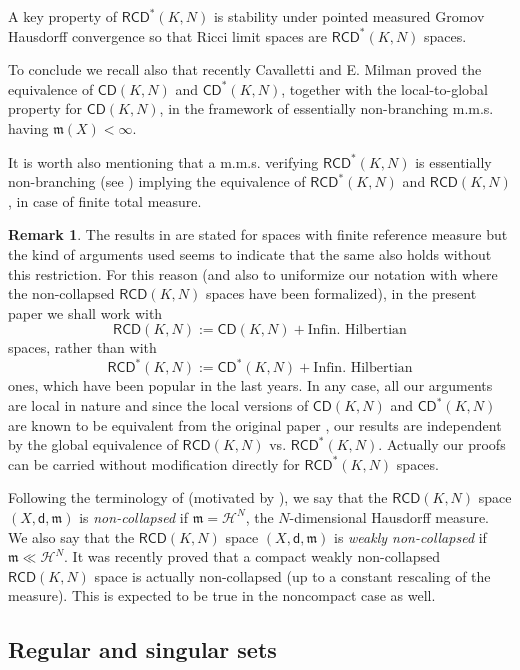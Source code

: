 \documentclass[a4paper]{amsart}
\theoremstyle{plain}
\theoremstyle{definition}
\newtheorem{remark}[lemma]{Remark}
\numberwithin{equation}{section}
\newcommand{\RCD}{\mathsf{RCD}}
\newcommand{\CD}{\mathsf{CD}}
\newcommand{\mm}{\mathfrak m}
\newcommand{\sfd}{\mathsf d}
\newcommand{\cH}{\mathcal{H}}
\begin{document}
{{A key property of $\RCD^{*}(K,N)$ is  stability under pointed measured Gromov Hausdorff convergence  \cite{AGS,GMS2013} so that Ricci limit spaces are $\RCD^{*}(K,N)$ spaces.

To conclude we recall also that recently  Cavalletti and E. Milman \cite{CaMi} proved the equivalence
of $\CD(K,N)$ and $\CD^{*}(K,N)$, together with the local-to-global property for $\CD(K,N)$, in the framework of  essentially non-branching m.m.s. having $\mm(X) < \infty$.

It is worth also mentioning that a m.m.s. verifying $\RCD^{*}(K,N)$ is essentially non-branching (see \cite[Corollary 1.2]{rajalasturm})
implying the equivalence of $\RCD^{*}(K,N)$ and  $\RCD(K,N)$, in case of finite total measure.

\begin{remark}
The results in \cite{CaMi} are stated for spaces with finite reference measure but the kind of
arguments used seems to indicate that the same also holds without this restriction. For
this reason (and also to uniformize our notation with \cite{GDPNonColl} where the non-collapsed $\RCD(K,N)$ spaces have been formalized), in the present  paper we shall work with
$$\RCD(K,N):=\CD(K,N)+ \text{Infin. Hilbertian}$$
spaces, rather than with 
$$\RCD^{*}(K,N):=\CD^{*}(K,N)+ \text{Infin. Hilbertian}$$
ones, which have been popular in the last years. In any case, all our arguments are local in nature and since the
local versions of $\CD(K,N)$ and $\CD^{*}(K,N)$ are known to be equivalent from the original paper \cite{BS10}, our results are independent by the global equivalence of $\RCD(K,N)$ vs. $\RCD^{*}(K,N)$. Actually our proofs can be carried without modification directly for $\RCD^{*}(K,N)$ spaces.
\end{remark}

Following the terminology of \cite{GDPNonColl}  (motivated by \cite{CC97}), we say that the $\RCD(K,N)$ space $(X,\sfd,\mm)$ is \emph{non-collapsed} if $\mm=\cH^{N}$, the $N$-dimensional Hausdorff measure. 
We also say that the $\RCD(K,N)$ space $(X,\sfd,\mm)$ is \emph{weakly non-collapsed} if $\mm\ll \cH^{N}$. It was recently proved  \cite{HondaNC} that a compact weakly non-collapsed $\RCD(K,N)$ space is actually non-collapsed (up to a constant rescaling of the measure). This is expected to be true in the noncompact case as well.






 }


\subsection{Regular and singular sets}


}
\end{document}
